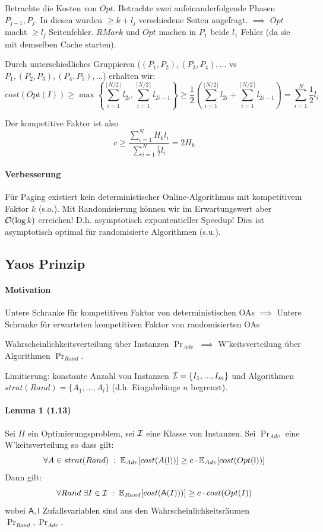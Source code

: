 Betrachte die Kosten von $Opt$.
Betrachte zwei aufeinanderfolgende Phasen $P_{j-1}, P_j$.
In diesen wurden $\geq k+l_j$ verschiedene Seiten angefragt.
$\implies$ $Opt$ macht $\geq l_j$ Seitenfehler.
$RMark$ und $Opt$ machen in $P_1$ beide $l_1$ Fehler (da sie mit demselben Cache starten).

Durch unterschiedliches Gruppieren ($(P_1, P_2), (P_3, P_4), ...$ vs $P_1, (P_2, P_3), (P_4, P_5), ...$)
erhalten wir:
$$ cost(Opt(I))
    \geq \max \left\{ \sum_{i=1}^{ \lfloor N/2 \rfloor } l_{2i} , \sum_{i=1}^{ \lceil N/2 \rceil } l_{2i-1} \right\}
    \geq \frac{1}{2} \left( \sum_{i=1}^{ \lfloor N/2 \rfloor } l_{2i} + \sum_{i=1}^{ \lceil N/2 \rceil } l_{2i-1} \right)
    = \sum_{i=1}^{N} \frac{1}{2} l_i
$$

Der kompetitive Faktor ist also
$$ c \geq \dfrac{ \sum_{i=1}^{N} H_k l_i }{ \sum_{i=1}^{N} \frac{1}{2} l_i } = 2 H_k $$

\paragraph{Verbesserung}
Für Paging existiert kein deterministischer Online-Algorithmus mit kompetitivem Faktor $k$ (s.o.).
Mit Randomisierung können wir im Erwartungswert aber $\mathcal{O}(\log k)$ erreichen!
D.h. asymptotisch expontentieller Speedup!
Dies ist asymptotisch optimal für randomisierte Algorithmen (s.u.).


\subsection{Yaos Prinzip}

\paragraph{Motivation}
Untere Schranke für kompetitiven Faktor von deterministischen OAs
$\implies$ Untere Schranke für erwarteten kompetitiven Faktor von randomisierten OAs

Wahrscheinlichkeitsverteilung über Instanzen $\Pr_{Adv}$ $\implies$ W'keitsverteilung über Algorithmen $\Pr_{Rand}$.

Limitierung: konstante Anzahl von Instanzen $\mathcal{I} = \{I_1, ..., I_m\}$ und Algorithmen
$strat(Rand) = \{A_1, ..., A_l\}$ (d.h. Eingabelänge $n$ begrenzt).

\paragraph{Lemma 1 (1.13)}
Sei $\Pi$ ein Optimierungsproblem, sei $\mathcal{I}$ eine Klasse von Instanzen.
Sei $\Pr_{Adv}$ eine W'keitsverteilung so dass gilt:
$$ \forall A \in strat(Rand) \; : \; \mathbb{E}_{Adv}[cost(A(\mathsf{I}))] \geq c \cdot \mathbb{E}_{Adv}[cost(Opt(\mathsf{I}))] $$
Dann gilt:
$$ \forall Rand \; \exists I \in \mathcal{I} \; : \; \mathbb{E}_{Rand}[cost(\mathsf{A}(I)))] \geq c \cdot cost(Opt(I)) $$
wobei $\mathsf{A} ,\mathsf{I}$ Zufallsvariablen sind aus den Wahrscheinlichkeitsräumen $\Pr_{Rand}, \Pr_{Adv}$.

